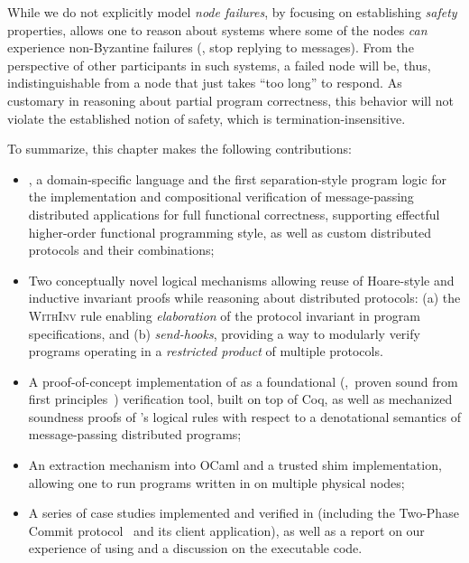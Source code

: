 While we do not explicitly model \emph{node failures}, by focusing on
establishing \emph{safety} properties, \disel allows one to reason
about systems where some of the nodes \emph{can} experience
non-Byzantine failures (\ie, stop replying to messages).
%
From the perspective of other participants in such systems, a failed
node will be, thus, indistinguishable from a node that just takes
``too long'' to respond. As customary in reasoning about partial
program correctness, this behavior will not violate the established
notion of safety, which is termination-insensitive.

To summarize, this chapter makes the following contributions:

\begin{itemize}
\item \disel, a domain-specific language and the first
  separation-style program logic for the implementation and
  compositional verification of message-passing distributed
  applications for full functional correctness, supporting effectful
  higher-order functional programming style, as well as custom
  distributed protocols and their combinations;

\item Two conceptually novel logical mechanisms allowing reuse of
  Hoare-style and inductive invariant proofs while reasoning about
  distributed protocols: (a) the \textsc{WithInv} rule enabling
  \emph{elaboration} of the protocol invariant in program
  specifications, and (b) \emph{send-hooks}, providing a way to
  modularly verify programs operating in a \emph{restricted product}
  of multiple protocols.

\item A proof-of-concept implementation of \disel as a foundational
  (\ie,~proven sound from first principles~\cite{Appel:LICS01})
  verification tool, built on top of Coq, as well as mechanized soundness
  proofs of \disel's logical rules with respect to a denotational
  semantics of message-passing distributed programs;

\item An extraction mechanism into OCaml and a trusted shim
  implementation, allowing one to run programs written in \disel on
  multiple physical nodes;

\item A series of case studies implemented and verified in \disel
  (including the Two-Phase Commit protocol~\cite{Weikum-Vossen:TIS02}
  and its client application), as well as a report on our experience
  of using \disel and a discussion on the executable code.

\end{itemize}
%

